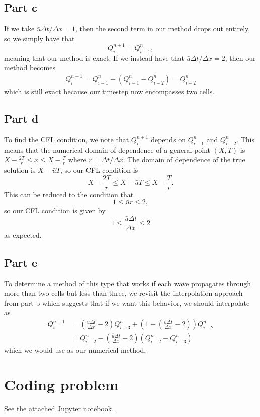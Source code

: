 \documentclass{article}
\begin{document}
\subsection{Part c}
If we take $\bar u\Delta t/\Delta x=1$, then the second term in our method drops out entirely, so we simply have that 
\[
Q^{n+1}_i=Q^n_{i-1},
\]
meaning that our method is exact. If we instead have that $\bar u\Delta t/\Delta x=2$, then our method becomes 
\begin{align*}
Q^{n+1}_i=Q^n_{i-1}-(Q^n_{i-1}-Q^n_{i-2})=Q^n_{i-2}
\end{align*}
which is still exact because our timestep now encompasses two cells.
\subsection{Part d}
To find the CFL condition, we note that $Q^{n+1}_i$ depends on $Q^n_{i-1}$ and $Q^n_{i-2}$. This means that the numerical domain of dependence of a general point $(X,T)$ is $X-\frac{2T}{r}\leq x\leq X-\frac{T}{r}$ where $r=\Delta t/\Delta x$. The domain of dependence of the true solution is $X-\bar uT$, so our CFL condition is
\[
X-\frac{2T}{r}\leq X-\bar uT\leq X-\frac{T}{r}.
\]
This can be reduced to the condition that
\[
1\leq\bar ur\leq2,
\]
so our CFL condition is given by
\[
1\leq\frac{\bar u\Delta t}{\Delta x}\leq2
\]
as expected.
\subsection{Part e}
To determine a method of this type that works if each wave propagates through more than two cells but less than three, we revisit the interpolation approach from part b which suggests that if we want this behavior, we should interpolate as
\begin{align*}
	Q^{n+1}_i&=\left(\frac{\bar u\Delta t}{\Delta x}-2\right)Q^n_{i-3}+\left(1-\left(\frac{\bar u\Delta t}{\Delta x}-2\right)\right)Q^n_{i-2}\\&=
	Q^n_{i-2}-\left(\frac{\bar u\Delta t}{\Delta x}-2\right)(Q^n_{i-2}-Q^n_{i-3})
\end{align*}
which we would use as our numerical method.

\section{Coding problem}
See the attached Jupyter notebook.
\end{document}

